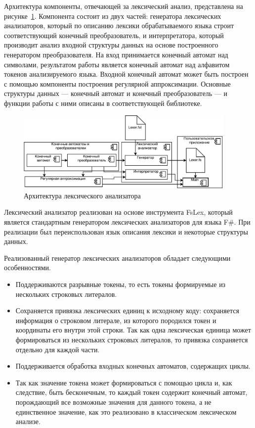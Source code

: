 Архитектура компоненты, отвечающей за лексический анализ, представлена на рисунке~\ref{fig:LexArch}. Компонента состоит из двух частей: генератора лексических анализаторов, который по описанию лексики обрабатываемого языка строит соответствующий конечный преобразователь, и интерпретатора, который производит анализ входной структуры данных на основе построенного генератором преобразователя.  На вход принимается конечный автомат над символами, результатом работы является конечный автомат над алфавитом токенов анализируемого языка. Входной конечный автомат может быть построен с помощью компоненты построения регулярной аппроксимации. Основные структуры данных --- конечный автомат и конечный преобразователь --- и функции работы с ними описаны в соответствующей библиотеке.

\begin{figure}[h!]
\begin{center}
\includegraphics[width=0.95\textwidth]{pics/LexerDiagram}
\caption{Архитектура лексического анализатора}
\label{fig:LexArch} 
\end{center}
\end{figure}

Лексический анализатор реализован на основе инструмента FsLex, который является стандартным генератором лексических анализаторов для языка F\#. При реализации был переиспользован язык описания лексики и некоторые структуры данных.

Реализованный генератор лексических анализаторов обладает следующими особенностями.
\begin{itemize}
    \item Поддерживаются разрывные токены, то есть токены формируемые из нескольких строковых литералов.
    \item Сохраняется привязка лексических единиц к исходному коду: сохраняется информация о строковом литерале, из которого породился токен и координаты его внутри этой строки. Так как одна лексическая единица может формироваться из нескольких строковых литералов, то привязка сохраняется отдельно для каждой части.
    \item Поддерживается обработка входных конечных автоматов, содержащих циклы.
    \item Так как значение токена может формироваться с помощью цикла и, как следствие, быть бесконечным, то каждый токен содержит конечный автомат, порождающий все возможные значения для данного токена, а не единственное значение, как это реализовано в классическом лексическом анализе.
\end{itemize}

